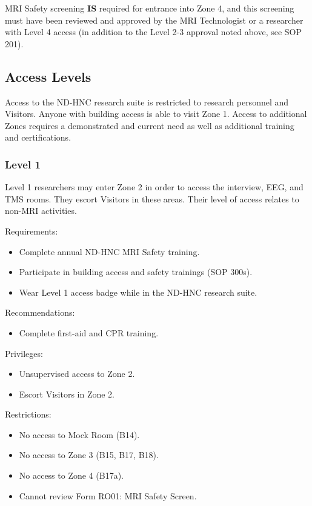 \documentclass[11pt]{article}
\begin{document}
MRI Safety screening \textbf{IS} required for entrance into Zone 4, and this screening must have been reviewed and approved by the MRI Technologist or a researcher with Level 4 access (in addition to the Level 2-3 approval noted above, see SOP 201).


\subsection{Access Levels}
\label{ssec:access-levels}

Access to the ND-HNC research suite is restricted to research personnel and Visitors. Anyone with building access is able to visit Zone 1. Access to additional Zones requires a demonstrated and current need as well as additional training and certifications.

\subsubsection{Level 1}
\label{sssec:access-levels-1}

Level 1 researchers may enter Zone 2 in order to access the interview, EEG, and TMS rooms. They escort Visitors in these areas. Their level of access relates to non-MRI activities.

Requirements:
\begin{itemize}
	\item Complete annual ND-HNC MRI Safety training.
	\item Participate in building access and safety trainings (SOP 300s).
	\item Wear Level 1 access badge while in the ND-HNC research suite.
\end{itemize}

Recommendations:
\begin{itemize}
	\item Complete first-aid and CPR training.
\end{itemize}

Privileges:
\begin{itemize}
	\item Unsupervised access to Zone 2.
	\item Escort Visitors in Zone 2.
\end{itemize}

Restrictions:
\begin{itemize}
	\item No access to Mock Room (B14).
	\item No access to Zone 3 (B15, B17, B18).
	\item No access to Zone 4 (B17a).
	\item Cannot review Form RO01: MRI Safety Screen.
\end{itemize}
\end{document}
